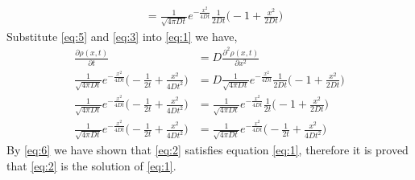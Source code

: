 \documentclass[a4paper,12pt]{article}
\begin{document}
\begin{enumerate}
\begin{equation}
\begin{aligned}
	&= \frac{1}{\sqrt{4\pi D t}} e^{-\frac{x^2}{4Dt}}\frac{1}{2Dt} \bigg( -1+\frac{x^2}{2Dt} \bigg)
	\end{aligned}
	\end{equation}
	Substitute \eqref{eq:5} and \eqref{eq:3} into \eqref{eq:1} we have,
	\begin{equation}\label{eq:6}
	\begin{aligned}
	\frac{\partial \rho(x,t)}{\partial t} &= D \frac{\partial^2 \rho(x,t)}{\partial x^2}\\
	\frac{1}{\sqrt{4\pi D t}} e^{-\frac{x^2}{4Dt}} \bigg( -\frac{1}{2t} + \frac{x^2}{4Dt^2} \bigg) &= D\frac{1}{\sqrt{4\pi D t}} e^{-\frac{x^2}{4Dt}}\frac{1}{2Dt} \bigg( -1+\frac{x^2}{2Dt} \bigg)\\
	\frac{1}{\sqrt{4\pi D t}} e^{-\frac{x^2}{4Dt}} \bigg( -\frac{1}{2t} + \frac{x^2}{4Dt^2} \bigg) &= \frac{1}{\sqrt{4\pi D t}} e^{-\frac{x^2}{4Dt}}\frac{1}{2t} \bigg( -1+\frac{x^2}{2Dt} \bigg)\\
	\frac{1}{\sqrt{4\pi D t}} e^{-\frac{x^2}{4Dt}} \bigg( -\frac{1}{2t} + \frac{x^2}{4Dt^2} \bigg) &= \frac{1}{\sqrt{4\pi D t}} e^{-\frac{x^2}{4Dt}} \bigg( -\frac{1}{2t}+\frac{x^2}{4Dt^2} \bigg)
	\end{aligned}
	\end{equation}
	By \eqref{eq:6} we have shown that \eqref{eq:2} satisfies equation \eqref{eq:1}, therefore it is proved that \eqref{eq:2} is the solution of \eqref{eq:1}.
	

\end{enumerate}
\end{document}
